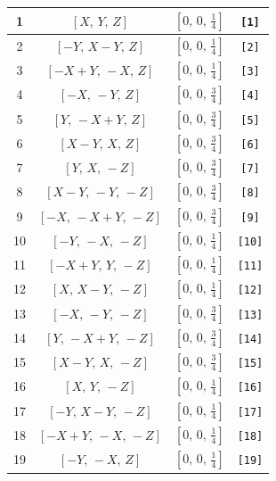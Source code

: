 \documentclass[fleqn,8pt]{jsarticle}
\begin{document}
\begin{longtable}{cccc}
1 & $\left[ X,\, Y,\, Z \right]$ & $\left[ 0,\, 0,\, \frac{1}{4} \right]$ & {\tt [1]} \\ \hline
2 & $\left[ - Y,\, X - Y,\, Z \right]$ & $\left[ 0,\, 0,\, \frac{1}{4} \right]$ & {\tt [2]} \\ \hline
3 & $\left[ - X + Y,\, - X,\, Z \right]$ & $\left[ 0,\, 0,\, \frac{1}{4} \right]$ & {\tt [3]} \\ \hline
4 & $\left[ - X,\, - Y,\, Z \right]$ & $\left[ 0,\, 0,\, \frac{3}{4} \right]$ & {\tt [4]} \\ \hline
5 & $\left[ Y,\, - X + Y,\, Z \right]$ & $\left[ 0,\, 0,\, \frac{3}{4} \right]$ & {\tt [5]} \\ \hline
6 & $\left[ X - Y,\, X,\, Z \right]$ & $\left[ 0,\, 0,\, \frac{3}{4} \right]$ & {\tt [6]} \\ \hline
7 & $\left[ Y,\, X,\, - Z \right]$ & $\left[ 0,\, 0,\, \frac{3}{4} \right]$ & {\tt [7]} \\ \hline
8 & $\left[ X - Y,\, - Y,\, - Z \right]$ & $\left[ 0,\, 0,\, \frac{3}{4} \right]$ & {\tt [8]} \\ \hline
9 & $\left[ - X,\, - X + Y,\, - Z \right]$ & $\left[ 0,\, 0,\, \frac{3}{4} \right]$ & {\tt [9]} \\ \hline
10 & $\left[ - Y,\, - X,\, - Z \right]$ & $\left[ 0,\, 0,\, \frac{1}{4} \right]$ & {\tt [10]} \\ \hline
11 & $\left[ - X + Y,\, Y,\, - Z \right]$ & $\left[ 0,\, 0,\, \frac{1}{4} \right]$ & {\tt [11]} \\ \hline
12 & $\left[ X,\, X - Y,\, - Z \right]$ & $\left[ 0,\, 0,\, \frac{1}{4} \right]$ & {\tt [12]} \\ \hline
13 & $\left[ - X,\, - Y,\, - Z \right]$ & $\left[ 0,\, 0,\, \frac{3}{4} \right]$ & {\tt [13]} \\ \hline
14 & $\left[ Y,\, - X + Y,\, - Z \right]$ & $\left[ 0,\, 0,\, \frac{3}{4} \right]$ & {\tt [14]} \\ \hline
15 & $\left[ X - Y,\, X,\, - Z \right]$ & $\left[ 0,\, 0,\, \frac{3}{4} \right]$ & {\tt [15]} \\ \hline
16 & $\left[ X,\, Y,\, - Z \right]$ & $\left[ 0,\, 0,\, \frac{1}{4} \right]$ & {\tt [16]} \\ \hline
17 & $\left[ - Y,\, X - Y,\, - Z \right]$ & $\left[ 0,\, 0,\, \frac{1}{4} \right]$ & {\tt [17]} \\ \hline
18 & $\left[ - X + Y,\, - X,\, - Z \right]$ & $\left[ 0,\, 0,\, \frac{1}{4} \right]$ & {\tt [18]} \\ \hline
19 & $\left[ - Y,\, - X,\, Z \right]$ & $\left[ 0,\, 0,\, \frac{1}{4} \right]$ & {\tt [19]} \\ \hline

\end{longtable}
\end{document}
